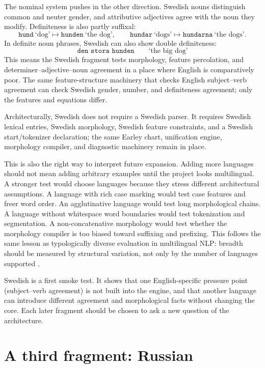 \documentclass[11pt]{article}
\theoremstyle{definition}
\theoremstyle{plain}
\theoremstyle{remark}
\begin{document}
The nominal system pushes in the other direction. Swedish nouns distinguish
common and neuter gender, and attributive adjectives agree with the noun they
modify. Definiteness is also partly suffixal:
\[
  \texttt{hund}\ \text{`dog'} \mapsto \texttt{hunden}\ \text{`the dog'},
  \qquad
  \texttt{hundar}\ \text{`dogs'} \mapsto \texttt{hundarna}\ \text{`the dogs'}.
\]
In definite noun phrases, Swedish can also show double definiteness:
\[
  \texttt{den stora hunden}
  \qquad
  \text{`the big dog'}
\]
This means the Swedish fragment tests morphology, feature percolation, and
determiner--adjective--noun agreement in a place where English is comparatively
poor. The same feature-structure machinery that checks English subject--verb
agreement can check Swedish gender, number, and definiteness agreement; only the
features and equations differ.

Architecturally, Swedish does not require a Swedish parser. It requires Swedish
lexical entries, Swedish morphology, Swedish feature constraints, and a Swedish
start/tokenizer declaration; the same Earley chart, unification engine, morphology
compiler, and diagnostic machinery remain in place.

This is also the right way to interpret future expansion. Adding more languages
should not mean adding arbitrary examples until the project looks multilingual.
A stronger test would choose languages because they stress different
architectural assumptions. A language with rich case marking would test case
features and freer word order. An agglutinative language would test long
morphological chains. A language without whitespace word boundaries would test
tokenization and segmentation. A non-concatenative morphology would test whether
the morphology compiler is too biased toward suffixing and prefixing. This
follows the same lesson as typologically diverse evaluation in multilingual NLP:
breadth should be measured by structural variation, not only by the number of
languages supported \cite{ploeger2025typdiv}.

Swedish is a first smoke test. It shows that one English-specific pressure
point (subject--verb agreement) is not built into the engine, and that another
language can introduce different agreement and morphological facts without changing
the core. Each later fragment should be chosen to ask a new question of the
architecture.

\section{A third fragment: Russian}
\label{sec:russian}
\end{document}

